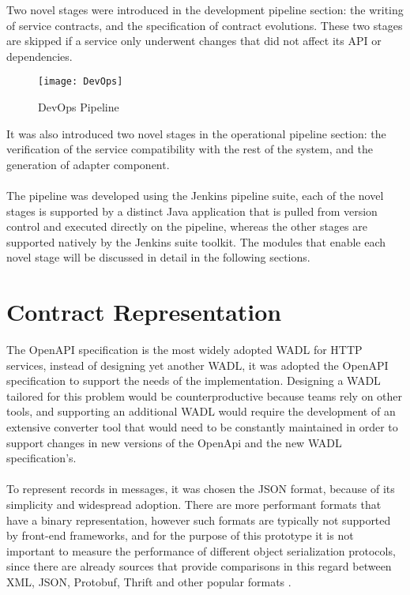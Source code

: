Two novel stages were introduced in the development pipeline section: the writing of service contracts, and the specification of contract evolutions.
These two stages are skipped if a service only underwent changes that did not affect its API or dependencies.

\begin{figure}[htbp]
    \centering
    \texttt{[image: DevOps]}
    \caption{DevOps Pipeline}
    \label{fig:pipeline}
\end{figure}

It was also introduced two novel stages in the operational pipeline section:
the verification of the service compatibility with the rest of the system, and the generation of adapter component.

\paragraph{}

The pipeline was developed using the Jenkins pipeline suite, each of the novel stages is supported by a distinct Java application that is pulled from version control
and executed directly on the pipeline, whereas the other stages are supported natively by the Jenkins suite toolkit.
The modules that enable each novel stage will be discussed in detail in the following sections.

\section{Contract Representation} %
\label{sec:contract_representation}

The OpenAPI specification is the most
widely adopted WADL for HTTP services, instead of designing yet another WADL, it was
adopted the OpenAPI specification to support the needs of the implementation.
Designing a WADL tailored for this problem would be counterproductive because teams rely on other tools,
and supporting an additional WADL would require the development of an extensive converter tool
that would need to be constantly maintained in order to support changes in new versions of the OpenApi and the new WADL specification's.

\paragraph{}

To represent records in messages, it was chosen the JSON format, because of its simplicity and widespread adoption.
There are more performant formats that have a binary representation,
however such formats are typically not supported by front-end frameworks, and for the purpose of this prototype
it is not important to measure the performance of different object serialization protocols, since
there are already sources that provide comparisons in this regard between XML, JSON, Protobuf, Thrift and other popular formats \cite{serializationBenchmark}.

